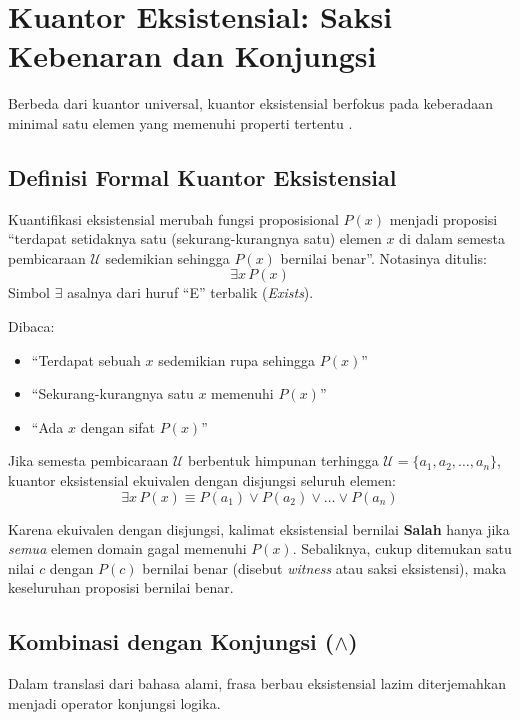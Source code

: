 \section{Kuantor Eksistensial: Saksi Kebenaran dan Konjungsi}

Berbeda dari kuantor universal, kuantor eksistensial berfokus pada keberadaan minimal satu elemen yang memenuhi properti tertentu \cite{rosen2019}.

\subsection{Definisi Formal Kuantor Eksistensial}

\begin{definisi}
Kuantifikasi eksistensial merubah fungsi proposisional $P(x)$ menjadi proposisi ``terdapat setidaknya satu (sekurang-kurangnya satu) elemen $x$ di dalam semesta pembicaraan $\mathcal{U}$ sedemikian sehingga $P(x)$ bernilai benar''. Notasinya ditulis:
\[ \exists x \, P(x) \]
Simbol $\exists$ asalnya dari huruf ``E'' terbalik (\textit{Exists}).
\end{definisi}

Dibaca:
\begin{itemize}
    \item ``Terdapat sebuah $x$ sedemikian rupa sehingga $P(x)$''
    \item ``Sekurang-kurangnya satu $x$ memenuhi $P(x)$''
    \item ``Ada $x$ dengan sifat $P(x)$''
\end{itemize}

Jika semesta pembicaraan $\mathcal{U}$ berbentuk himpunan terhingga $\mathcal{U} = \{a_1, a_2, \ldots, a_n\}$, kuantor eksistensial ekuivalen dengan disjungsi seluruh elemen:
\[ \exists x \, P(x) \equiv P(a_1) \lor P(a_2) \lor \ldots \lor P(a_n) \]

Karena ekuivalen dengan disjungsi, kalimat eksistensial bernilai \textbf{Salah} hanya jika \emph{semua} elemen domain gagal memenuhi $P(x)$. Sebaliknya, cukup ditemukan satu nilai $c$ dengan $P(c)$ bernilai benar (disebut \textit{witness} atau saksi eksistensi), maka keseluruhan proposisi bernilai benar.

\subsection{Kombinasi dengan Konjungsi ($\land$)}

Dalam translasi dari bahasa alami, frasa berbau eksistensial lazim diterjemahkan menjadi operator konjungsi logika.


